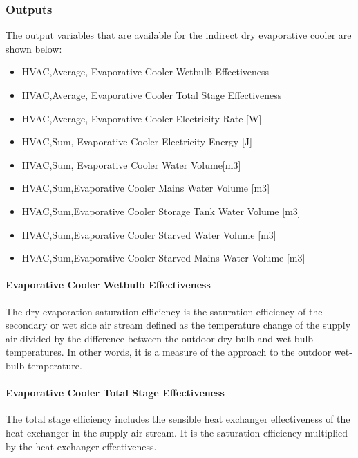 \subsubsection{Outputs}\label{outputs-2-008}

The output variables that are available for the indirect dry evaporative cooler are shown below:

\begin{itemize}
\item
  HVAC,Average, Evaporative Cooler Wetbulb Effectiveness
\item
  HVAC,Average, Evaporative Cooler Total Stage Effectiveness
\item
  HVAC,Average, Evaporative Cooler Electricity Rate {[}W{]}
\item
  HVAC,Sum, Evaporative Cooler Electricity Energy {[}J{]}
\item
  HVAC,Sum, Evaporative Cooler Water Volume{[}m3{]}
\item
  HVAC,Sum,Evaporative Cooler Mains Water Volume {[}m3{]}
\item
  HVAC,Sum,Evaporative Cooler Storage Tank Water Volume {[}m3{]}
\item
  HVAC,Sum,Evaporative Cooler Starved Water Volume {[}m3{]}
\item
  HVAC,Sum,Evaporative Cooler Starved Mains Water Volume {[}m3{]}
\end{itemize}

\paragraph{Evaporative Cooler Wetbulb Effectiveness}\label{evaporative-cooler-wetbulb-effectiveness}

The dry evaporation saturation efficiency is the saturation efficiency of the secondary or wet side air stream defined as the temperature change of the supply air divided by the difference between the outdoor dry-bulb and wet-bulb temperatures. In other words, it is a measure of the approach to the outdoor wet-bulb temperature.

\paragraph{Evaporative Cooler Total Stage Effectiveness}\label{evaporative-cooler-total-stage-effectiveness}

The total stage efficiency includes the sensible heat exchanger effectiveness of the heat exchanger in the supply air stream. It is the saturation efficiency multiplied by the heat exchanger effectiveness.

